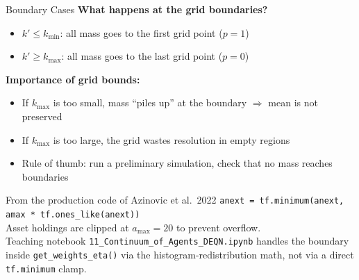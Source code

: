 \documentclass[aspectratio=169,11pt]{beamer}
\newcommand{\emphc}[1]{\textcolor{harvardcrimson}{#1}}
\begin{document}
\begin{frame}[shrink=15]{Boundary Cases}
\textbf{What happens at the grid boundaries?}

\vspace{0.5em}
\begin{itemize}
    \item $k' \leq k_{\min}$: all mass goes to the \emphc{first grid point} ($p = 1$)
    \item $k' \geq k_{\max}$: all mass goes to the \emphc{last grid point} ($p = 0$)
\end{itemize}

\vspace{0.5em}
\textbf{Importance of grid bounds:}
\begin{itemize}
    \item If $k_{\max}$ is too small, mass ``piles up'' at the boundary $\Rightarrow$ \emphc{mean is not preserved}
    \item If $k_{\max}$ is too large, the grid wastes resolution in empty regions
    \item Rule of thumb: run a preliminary simulation, check that no mass reaches boundaries
\end{itemize}

\vspace{0.5em}
\begin{block}{From the production code of Azinovic et al.\ 2022}
\vspace{-0.2em}
\texttt{anext = tf.minimum(anext, amax * tf.ones\_like(anext))}\\[2pt]
{\small Asset holdings are clipped at $a_{\max} = 20$ to prevent overflow.\\
\emphc{Teaching notebook \texttt{11\_Continuum\_of\_Agents\_DEQN.ipynb} handles the boundary inside \texttt{get\_weights\_eta()} via the histogram-redistribution math, not via a direct \texttt{tf.minimum} clamp.}}
\end{block}
\end{frame}
\end{document}
